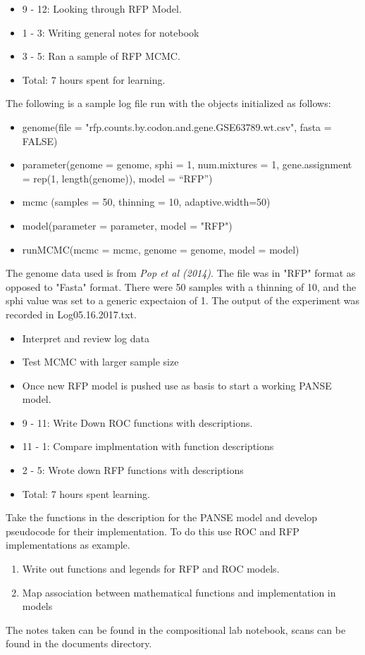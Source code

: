 \documentclass[12pt,hyperref]{labbook}
\begin{document}
\begin{itemize}
	\item 9 - 12: Looking through RFP Model.
	\item 1 - 3: Writing general notes for notebook
	\item 3 - 5: Ran a sample of RFP MCMC.
	\item Total: 7 hours spent for learning.
\end{itemize}
The following is a sample log file run with the objects initialized as follows:
\begin{itemize}
	\item genome(file = "rfp.counts.by.codon.and.gene.GSE63789.wt.csv", fasta = FALSE)
	\item parameter(genome = genome, sphi = 1, num.mixtures = 1, gene.assignment = rep(1, length(genome)), model = “RFP”)
	\item mcmc (samples = 50, thinning = 10, adaptive.width=50)
	\item model(parameter = parameter, model = "RFP")
	\item runMCMC(mcmc = mcmc, genome = genome, model = model)
\end{itemize}
The genome data used is from \textit{Pop et al (2014)}. The file was in "RFP" format as opposed to "Fasta" format. There were 50 samples with a thinning of 10, and the sphi value was set to a generic expectaion of 1.
\newline \newline
The output of the experiment was recorded in Log05.16.2017.txt.

\begin{itemize}
	\item Interpret and review log data
	\item Test MCMC with larger sample size
	\item Once new RFP model is pushed use as basis to start a working PANSE model.
\end{itemize}

\begin{itemize}
	\item 9 - 11: Write Down ROC functions with descriptions.
	\item 11 - 1: Compare implmentation with function descriptions
	\item 2 - 5: Wrote down RFP functions with descriptions
	\item Total: 7 hours spent learning.
\end{itemize}
Take the functions in the description for the PANSE model and develop pseudocode for their implementation. To do this use ROC and RFP implementations as example.
\begin{enumerate}
	\item Write out functions and legends for RFP and ROC models.
	\item Map association between mathematical functions and implementation in models
\end{enumerate}
The notes taken can be found in the compositional lab notebook, scans can be found in the documents directory.
\end{document}
